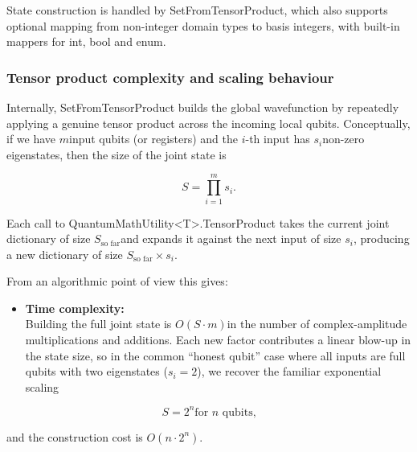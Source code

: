 \documentclass[a4paper,11pt]{article}
\begin{document}
State construction is handled by SetFromTensorProduct, which also supports optional mapping from non-integer domain types to basis integers, with built-in mappers for int, bool and enum.

\subsubsection{Tensor product complexity and scaling behaviour}

Internally, SetFromTensorProduct builds the global wavefunction by repeatedly applying a genuine tensor product across the incoming local qubits. Conceptually, if we have \(m\)input qubits (or registers) and the \(i\)-th input has \(s_{i}\)non-zero eigenstates, then the size of the joint state is

\[S = \prod_{i = 1}^{m}{}s_{i}.
\]

Each call to QuantumMathUtility\textless T\textgreater.TensorProduct takes the current joint dictionary of size \(S_{\text{so far}}\)and expands it against the next input of size \(s_{i}\), producing a new dictionary of size \(S_{\text{so far}} \times s_{i}\).

From an algorithmic point of view this gives:

\begin{itemize}
\item
  \textbf{Time complexity:}\\
  Building the full joint state is \(O(S \cdot m)\)in the number of complex-amplitude multiplications and additions. Each new factor contributes a linear blow-up in the state size, so in the common ``honest qubit'' case where all inputs are full qubits with two eigenstates (\(s_{i} = 2\)), we recover the familiar exponential scaling
\end{itemize}

\[S = 2^{n}\text{for }n\text{ qubits,}
\]

and the construction cost is \(O(n \cdot 2^{n})\).
\end{document}

